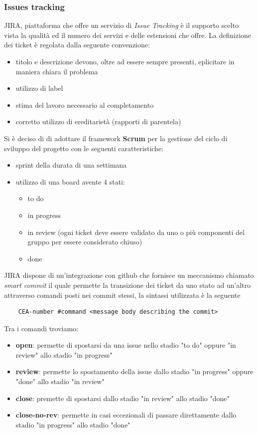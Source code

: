     \subsubsection{Issues tracking}
    JIRA, piattaforma che offre un servizio di \textit{Issue Tracking} è il supporto scelto vista la qualità ed il numero dei servizi e delle estensioni che offre.
    \newline
    La definizione dei ticket è regolata dalla seguente convenzione:
    \begin{itemize}
        \item titolo e descrizione devono, oltre ad essere sempre presenti, eplicitare in maniera chiara il problema
        \item utilizzo di label
        \item stima del lavoro necessario al completamento
        \item corretto utilizzo di ereditarietà (rapporti di parentela)
    \end{itemize}
    Si è deciso di di adottare il framework \textbf{Scrum} per la gestione del ciclo di sviluppo del progetto con le seguenti caratteristiche:
    \begin{itemize}
        \item sprint della durata di una settimana
        \item utilizzo di una board avente 4 stati:
            \begin{itemize}
                \item to do
                \item in progress
                \item in review (ogni ticket deve essere validato da uno o più componenti del gruppo per essere considerato chiuso)
                \item done
            \end{itemize}
    \end{itemize}

    JIRA dispone di un'integrazione con github che fornisce un meccanismo chiamato \textit{smart commit} il quale permette la transizione dei ticket da uno stato ad un'altro attraverso comandi posti nei commit stessi, la sintassi utilizzata è la seguente
    \begin{lstlisting}
    CEA-number #command <message body describing the commit>
    \end{lstlisting}
    Tra i comandi troviamo:
    \begin{itemize}
        \item \textbf{open}: permette di spostarsi da una issue nello stadio "to do" oppure "in review" allo stadio "in progress"
        \item \textbf{review}: permette lo spostamento della issue dallo stadio "in progress" oppure "done" allo stadio "in review"
        \item \textbf{close}: premette di spostarsi dallo stadio "in review" allo stadio "done"
        \item \textbf{close-no-rev}: permette in casi eccezionali di passare direttamente dallo stadio "in progress" allo stadio "done"
    \end{itemize}
    
